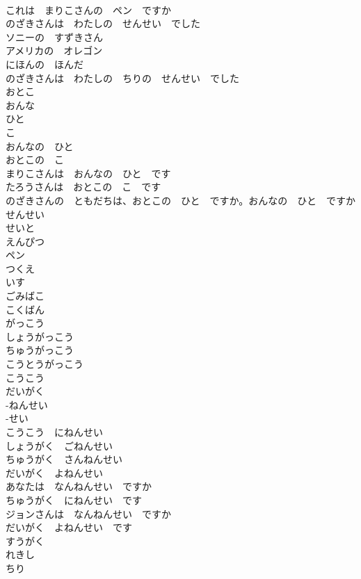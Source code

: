 \documentclass[8pt]{extreport}
\begin{document}
\begin{CJK}{UTF8}{min}
\\	これは　まりこさんの　ペン　ですか	
\\	のざきさんは　わたしの　せんせい　でした	
\\	ソニーの　すずきさん	
\\	アメリカの　オレゴン	
\\	にほんの　ほんだ	
\\	のざきさんは　わたしの　ちりの　せんせい　でした	
\\	おとこ	
\\	おんな	
\\	ひと	
\\	こ	
\\	おんなの　ひと	
\\	おとこの　こ	
\\	まりこさんは　おんなの　ひと　です	
\\	たろうさんは　おとこの　こ　です	
\\	のざきさんの　ともだちは、おとこの　ひと　ですか。おんなの　ひと　ですか	
\\	せんせい	
\\	せいと	
\\	えんぴつ	
\\	ペン	
\\	つくえ	
\\	いす	
\\	ごみばこ	
\\	こくばん	
\\	がっこう	
\\	しょうがっこう	
\\	ちゅうがっこう	
\\	こうとうがっこう	
\\	こうこう	
\\	だいがく	
\\	-ねんせい	
\\	-せい	
\\	こうこう　にねんせい	
\\	しょうがく　ごねんせい	
\\	ちゅうがく　さんねんせい	
\\	だいがく　よねんせい	
\\	あなたは　なんねんせい　ですか	
\\	ちゅうがく　にねんせい　です	
\\	ジョンさんは　なんねんせい　ですか	
\\	だいがく　よねんせい　です	
\\	すうがく	
\\	れきし	
\\	ちり	

\end{CJK}
\end{document}
